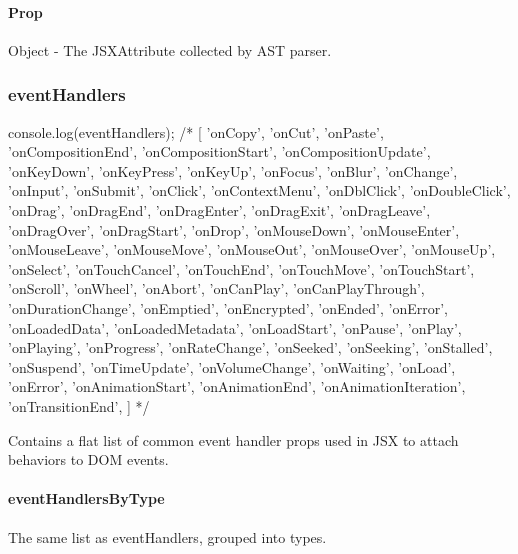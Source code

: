 \paragraph*{Prop}

Object -\/ The J\+S\+X\+Attribute collected by A\+ST parser.

\subsubsection*{event\+Handlers}


\begin{DoxyCode}
console.log(eventHandlers);
/*
[
  'onCopy',
  'onCut',
  'onPaste',
  'onCompositionEnd',
  'onCompositionStart',
  'onCompositionUpdate',
  'onKeyDown',
  'onKeyPress',
  'onKeyUp',
  'onFocus',
  'onBlur',
  'onChange',
  'onInput',
  'onSubmit',
  'onClick',
  'onContextMenu',
  'onDblClick',
  'onDoubleClick',
  'onDrag',
  'onDragEnd',
  'onDragEnter',
  'onDragExit',
  'onDragLeave',
  'onDragOver',
  'onDragStart',
  'onDrop',
  'onMouseDown',
  'onMouseEnter',
  'onMouseLeave',
  'onMouseMove',
  'onMouseOut',
  'onMouseOver',
  'onMouseUp',
  'onSelect',
  'onTouchCancel',
  'onTouchEnd',
  'onTouchMove',
  'onTouchStart',
  'onScroll',
  'onWheel',
  'onAbort',
  'onCanPlay',
  'onCanPlayThrough',
  'onDurationChange',
  'onEmptied',
  'onEncrypted',
  'onEnded',
  'onError',
  'onLoadedData',
  'onLoadedMetadata',
  'onLoadStart',
  'onPause',
  'onPlay',
  'onPlaying',
  'onProgress',
  'onRateChange',
  'onSeeked',
  'onSeeking',
  'onStalled',
  'onSuspend',
  'onTimeUpdate',
  'onVolumeChange',
  'onWaiting',
  'onLoad',
  'onError',
  'onAnimationStart',
  'onAnimationEnd',
  'onAnimationIteration',
  'onTransitionEnd',
]
*/
\end{DoxyCode}


Contains a flat list of common event handler props used in J\+SX to attach behaviors to D\+OM events.

\paragraph*{event\+Handlers\+By\+Type}

The same list as {\ttfamily event\+Handlers}, grouped into types.


